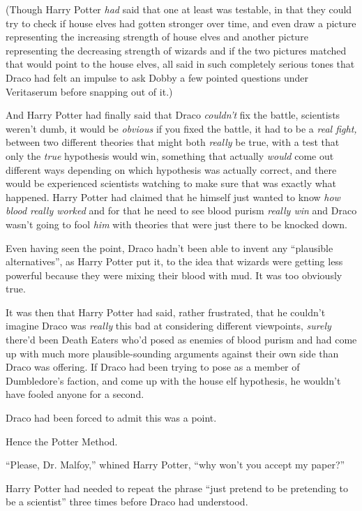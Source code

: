 (Though Harry Potter \emph{had} said that one at least was testable, in
that they could try to check if house elves had gotten stronger over
time, and even draw a picture representing the increasing strength of
house elves and another picture representing the decreasing strength of
wizards and if the two pictures matched that would point to the house
elves, all said in such completely serious tones that Draco had felt an
impulse to ask Dobby a few pointed questions under Veritaserum before
snapping out of it.)

And Harry Potter had finally said that Draco \emph{couldn't} fix the
battle, scientists weren't dumb, it would be \emph{obvious} if you fixed
the battle, it had to be a \emph{real fight,} between two different
theories that might both \emph{really} be true, with a test that only
the \emph{true} hypothesis would win, something that actually
\emph{would} come out different ways depending on which hypothesis was
actually correct, and there would be experienced scientists watching to
make sure that was exactly what happened. Harry Potter had claimed that
he himself just wanted to know \emph{how blood really worked} and for
that he need to see blood purism \emph{really win} and Draco wasn't
going to fool \emph{him} with theories that were just there to be
knocked down.

Even having seen the point, Draco hadn't been able to invent any
``plausible alternatives'', as Harry Potter put it, to the idea that
wizards were getting less powerful because they were mixing their blood
with mud. It was too obviously true.

It was then that Harry Potter had said, rather frustrated, that he
couldn't imagine Draco was \emph{really} this bad at considering
different viewpoints, \emph{surely} there'd been Death Eaters who'd
posed as enemies of blood purism and had come up with much more
plausible-sounding arguments against their own side than Draco was
offering. If Draco had been trying to pose as a member of Dumbledore's
faction, and come up with the house elf hypothesis, he wouldn't have
fooled anyone for a second.

Draco had been forced to admit this was a point.

Hence the Potter Method.

``Please, Dr. Malfoy,'' whined Harry Potter, ``why won't you accept my
paper?''

Harry Potter had needed to repeat the phrase ``just pretend to be
pretending to be a scientist'' three times before Draco had understood.

